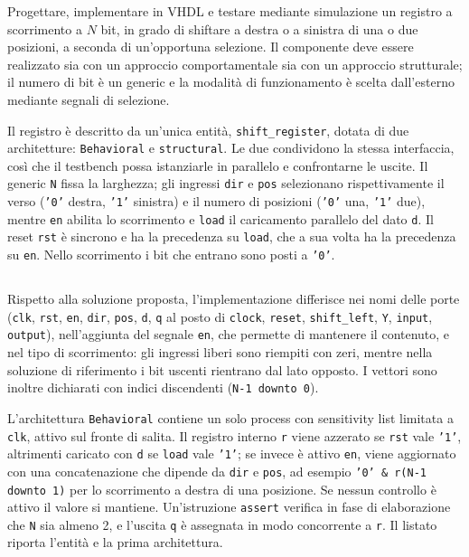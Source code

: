 \label{sec:esercizio4-1}

\begin{traccia}
Progettare, implementare in VHDL e testare mediante simulazione un registro a scorrimento a $N$ bit, in grado di shiftare a destra o a sinistra di una o due posizioni, a seconda di un'opportuna selezione. Il componente deve essere realizzato sia con un approccio comportamentale sia con un approccio strutturale; il numero di bit è un generic e la modalità di funzionamento è scelta dall'esterno mediante segnali di selezione.
\end{traccia}

\progetto

Il registro è descritto da un'unica entità, \texttt{shift\_register}, dotata di due architetture: \texttt{Behavioral} e \texttt{structural}. Le due condividono la stessa interfaccia, così che il testbench possa istanziarle in parallelo e confrontarne le uscite. Il generic \texttt{N} fissa la larghezza; gli ingressi \texttt{dir} e \texttt{pos} selezionano rispettivamente il verso (\texttt{'0'} destra, \texttt{'1'} sinistra) e il numero di posizioni (\texttt{'0'} una, \texttt{'1'} due), mentre \texttt{en} abilita lo scorrimento e \texttt{load} il caricamento parallelo del dato \texttt{d}. Il reset \texttt{rst} è sincrono e ha la precedenza su \texttt{load}, che a sua volta ha la precedenza su \texttt{en}. Nello scorrimento i bit che entrano sono posti a \texttt{'0'}.

\subsection*{}

Rispetto alla soluzione proposta, l'implementazione differisce nei nomi delle porte (\texttt{clk}, \texttt{rst}, \texttt{en}, \texttt{dir}, \texttt{pos}, \texttt{d}, \texttt{q} al posto di \texttt{clock}, \texttt{reset}, \texttt{shift\_left}, \texttt{Y}, \texttt{input}, \texttt{output}), nell'aggiunta del segnale \texttt{en}, che permette di mantenere il contenuto, e nel tipo di scorrimento: gli ingressi liberi sono riempiti con zeri, mentre nella soluzione di riferimento i bit uscenti rientrano dal lato opposto. I vettori sono inoltre dichiarati con indici discendenti (\texttt{N-1 downto 0}).

\implementazione

L'architettura \texttt{Behavioral} contiene un solo process con sensitivity list limitata a \texttt{clk}, attivo sul fronte di salita. Il registro interno \texttt{r} viene azzerato se \texttt{rst} vale \texttt{'1'}, altrimenti caricato con \texttt{d} se \texttt{load} vale \texttt{'1'}; se invece è attivo \texttt{en}, viene aggiornato con una concatenazione che dipende da \texttt{dir} e \texttt{pos}, ad esempio \texttt{'0' \& r(N-1 downto 1)} per lo scorrimento a destra di una posizione. Se nessun controllo è attivo il valore si mantiene. Un'istruzione \texttt{assert} verifica in fase di elaborazione che \texttt{N} sia almeno 2, e l'uscita \texttt{q} è assegnata in modo concorrente a \texttt{r}. Il listato riporta l'entità e la prima architettura.

